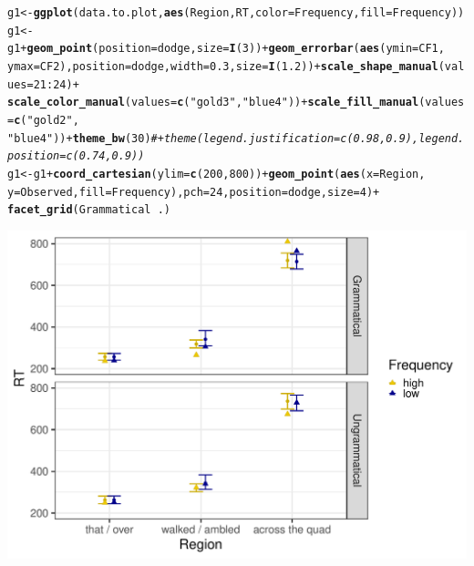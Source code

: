 \documentclass{article}\usepackage[]{graphicx}\usepackage[]{color}
\makeatletter
\def\maxwidth{ %
  \ifdim\Gin@nat@width>\linewidth
    \linewidth
  \else
    \Gin@nat@width
  \fi
}
\newcommand{\hlnum}[1]{\textcolor[rgb]{0.686,0.059,0.569}{#1}}%
\newcommand{\hlstr}[1]{\textcolor[rgb]{0.192,0.494,0.8}{#1}}%
\newcommand{\hlcom}[1]{\textcolor[rgb]{0.678,0.584,0.686}{\textit{#1}}}%
\newcommand{\hlopt}[1]{\textcolor[rgb]{0,0,0}{#1}}%
\newcommand{\hlstd}[1]{\textcolor[rgb]{0.345,0.345,0.345}{#1}}%
\newcommand{\hlkwb}[1]{\textcolor[rgb]{0.69,0.353,0.396}{#1}}%
\newcommand{\hlkwc}[1]{\textcolor[rgb]{0.333,0.667,0.333}{#1}}%
\newcommand{\hlkwd}[1]{\textcolor[rgb]{0.737,0.353,0.396}{\textbf{#1}}}%
\newenvironment{kframe}{%
 \def\at@end@of@kframe{}%
 \ifinner\ifhmode%
  \def\at@end@of@kframe{\end{minipage}}%
  \begin{minipage}{\columnwidth}%
 \fi\fi%
 \def\FrameCommand##1{\hskip\@totalleftmargin \hskip-\fboxsep
 \colorbox{shadecolor}{##1}\hskip-\fboxsep
     \hskip-\linewidth \hskip-\@totalleftmargin \hskip\columnwidth}%
 \MakeFramed {\advance\hsize-\width
   \@totalleftmargin\z@ \linewidth\hsize
   \@setminipage}}%
 {\par\unskip\endMakeFramed%
 \at@end@of@kframe}
\newenvironment{knitrout}{}{} %
\makeatother
\begin{document}
\begin{knitrout}
\color{fgcolor}\begin{kframe}
\begin{alltt}
\hlstd{g1} \hlkwb{<-} \hlkwd{ggplot}\hlstd{(data.to.plot,} \hlkwd{aes}\hlstd{(Region, RT,} \hlkwc{color} \hlstd{= Frequency,} \hlkwc{fill} \hlstd{= Frequency))}
\hlstd{g1} \hlkwb{<-} \hlstd{g1} \hlopt{+} \hlkwd{geom_point}\hlstd{(}\hlkwc{position} \hlstd{= dodge,} \hlkwc{size} \hlstd{=} \hlkwd{I}\hlstd{(}\hlnum{3}\hlstd{))} \hlopt{+} \hlkwd{geom_errorbar}\hlstd{(}\hlkwd{aes}\hlstd{(}\hlkwc{ymin} \hlstd{= CF1,}
    \hlkwc{ymax} \hlstd{= CF2),} \hlkwc{position} \hlstd{= dodge,} \hlkwc{width} \hlstd{=} \hlnum{0.3}\hlstd{,} \hlkwc{size} \hlstd{=} \hlkwd{I}\hlstd{(}\hlnum{1.2}\hlstd{))} \hlopt{+} \hlkwd{scale_shape_manual}\hlstd{(}\hlkwc{values} \hlstd{=} \hlnum{21}\hlopt{:}\hlnum{24}\hlstd{)} \hlopt{+}
    \hlkwd{scale_color_manual}\hlstd{(}\hlkwc{values} \hlstd{=} \hlkwd{c}\hlstd{(}\hlstr{"gold3"}\hlstd{,} \hlstr{"blue4"}\hlstd{))} \hlopt{+} \hlkwd{scale_fill_manual}\hlstd{(}\hlkwc{values} \hlstd{=} \hlkwd{c}\hlstd{(}\hlstr{"gold2"}\hlstd{,}
    \hlstr{"blue4"}\hlstd{))} \hlopt{+} \hlkwd{theme_bw}\hlstd{(}\hlnum{30}\hlstd{)}  \hlcom{# + theme(legend.justification = c(0.98, 0.9), legend.position = c(0.74, 0.9)) }
\hlstd{g1} \hlkwb{<-} \hlstd{g1} \hlopt{+} \hlkwd{coord_cartesian}\hlstd{(}\hlkwc{ylim} \hlstd{=} \hlkwd{c}\hlstd{(}\hlnum{200}\hlstd{,} \hlnum{800}\hlstd{))} \hlopt{+} \hlkwd{geom_point}\hlstd{(}\hlkwd{aes}\hlstd{(}\hlkwc{x} \hlstd{= Region,}
    \hlkwc{y} \hlstd{= Observed,} \hlkwc{fill} \hlstd{= Frequency),} \hlkwc{pch} \hlstd{=} \hlnum{24}\hlstd{,} \hlkwc{position} \hlstd{= dodge,} \hlkwc{size} \hlstd{=} \hlnum{4}\hlstd{)} \hlopt{+}
    \hlkwd{facet_grid}\hlstd{(Grammatical} \hlopt{~} \hlstd{.)}
\end{alltt}
\end{kframe}
\end{knitrout}

\begin{knitrout}
\color{fgcolor}
\includegraphics[width=\maxwidth]{figures/figure_staub_exp3unnamed-chunk-8-1} 

\end{knitrout}
\end{document}
